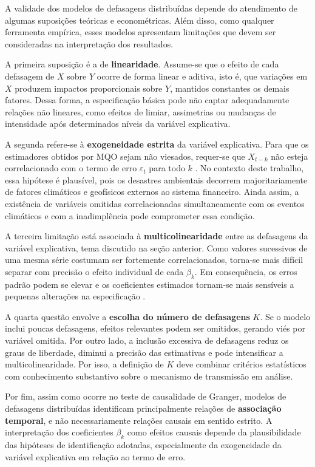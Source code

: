 A validade dos modelos de defasagens distribuídas depende do atendimento de algumas
suposições teóricas e econométricas. Além disso, como qualquer ferramenta empírica,
esses modelos apresentam limitações que devem ser consideradas na interpretação dos
resultados.

A primeira suposição é a de \textbf{linearidade}. Assume-se que o efeito de cada
defasagem de $X$ sobre $Y$ ocorre de forma linear e aditiva, isto é, que variações
em $X$ produzem impactos proporcionais sobre $Y$, mantidos constantes os demais
fatores. Dessa forma, a especificação básica pode não captar adequadamente relações
não lineares, como efeitos de limiar, assimetrias ou mudanças de intensidade após
determinados níveis da variável explicativa.

A segunda refere-se à \textbf{exogeneidade estrita} da variável explicativa. Para
que os estimadores obtidos por MQO sejam não viesados, requer-se que $X_{t-k}$ não
esteja correlacionado com o termo de erro $\varepsilon_t$ para todo $k$
\citep{wooldridge2010}. No contexto deste trabalho, essa hipótese é plausível, pois
os desastres ambientais decorrem majoritariamente de fatores climáticos e
geofísicos externos ao sistema financeiro. Ainda assim, a existência de variáveis
omitidas correlacionadas simultaneamente com os eventos climáticos e com a
inadimplência pode comprometer essa condição.

A terceira limitação está associada à \textbf{multicolinearidade} entre as
defasagens da variável explicativa, tema discutido na seção anterior. Como valores
sucessivos de uma mesma série costumam ser fortemente correlacionados, torna-se mais
difícil separar com precisão o efeito individual de cada $\beta_k$. Em consequência,
os erros padrão podem se elevar e os coeficientes estimados tornam-se mais sensíveis
a pequenas alterações na especificação \citep{judge1985}.

A quarta questão envolve a \textbf{escolha do número de defasagens} $K$. Se o modelo
inclui poucas defasagens, efeitos relevantes podem ser omitidos, gerando viés por
variável omitida. Por outro lado, a inclusão excessiva de defasagens reduz os graus
de liberdade, diminui a precisão das estimativas e pode intensificar a
multicolinearidade. Por isso, a definição de $K$ deve combinar critérios
estatísticos com conhecimento substantivo sobre o mecanismo de transmissão em
análise.

Por fim, assim como ocorre no teste de causalidade de Granger, modelos de
defasagens distribuídas identificam principalmente relações de
\textbf{associação temporal}, e não necessariamente relações causais em sentido
estrito. A interpretação dos coeficientes $\beta_k$ como efeitos causais depende da
plausibilidade das hipóteses de identificação adotadas, especialmente da
exogeneidade da variável explicativa em relação ao termo de erro.


